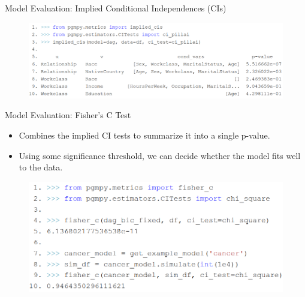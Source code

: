 \documentclass[aspectratio=169]{beamer}
\begin{document}
\begin{frame}{Model Evaluation: Implied Conditional Independences (CIs)}
	\begin{figure}
		\includegraphics[scale=0.27]{imgs/implied_cis.png}
	\end{figure}
\end{frame}

\begin{frame}{Model Evaluation: Fisher's C Test}
	\begin{itemize}
		\item Combines the implied CI tests to summarize it into a single p-value.
		\item Using some significance threshold, we can decide whether the model fits well to the data.
	\end{itemize}
	\vspace{2em}
	\begin{figure}
		\centering
		\includegraphics[scale=0.3]{imgs/fisherc.png}
	\end{figure}
\end{frame}
\end{document}
